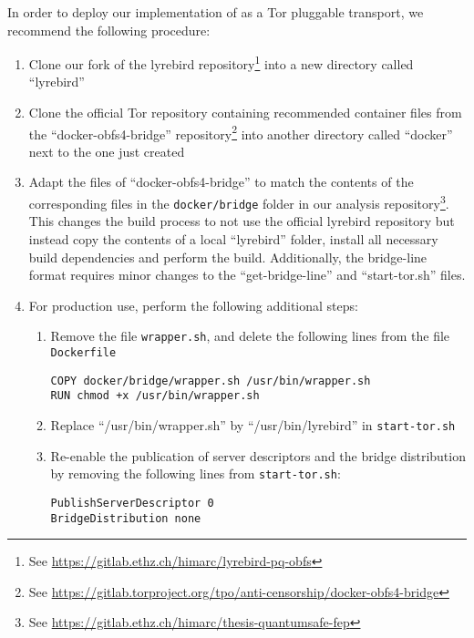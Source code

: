 In order to deploy our implementation of \drivel{} as a Tor pluggable transport, we recommend the following procedure:
\begin{enumerate}
    \item Clone our fork of the lyrebird repository\footnote{See \url{https://gitlab.ethz.ch/himarc/lyrebird-pq-obfs}} into a new directory called ``lyrebird''
    
    \item Clone the official Tor repository containing recommended container files from the ``docker-obfs4-bridge'' repository\footnote{See \url{https://gitlab.torproject.org/tpo/anti-censorship/docker-obfs4-bridge}} into another directory called ``docker'' next to the one just created
    
    \item Adapt the files of ``docker-obfs4-bridge'' to match the contents of the corresponding files in the \texttt{docker/bridge} folder in our analysis repository\footnote{See \url{https://gitlab.ethz.ch/himarc/thesis-quantumsafe-fep}}. This changes the build process to not use the official lyrebird repository but instead copy the contents of a local ``lyrebird'' folder, install all necessary build dependencies and perform the build. Additionally, the bridge-line format requires minor changes to the ``get-bridge-line'' and ``start-tor.sh'' files.

    \item For production use, perform the following additional steps:
    \begin{enumerate}
        \item Remove the file \texttt{wrapper.sh}, and delete the following lines from the file \texttt{Dockerfile}
        \begin{lstlisting}
COPY docker/bridge/wrapper.sh /usr/bin/wrapper.sh
RUN chmod +x /usr/bin/wrapper.sh
        \end{lstlisting}

        \item Replace ``/usr/bin/wrapper.sh'' by ``/usr/bin/lyrebird'' in \texttt{start-tor.sh}

        \item Re-enable the publication of server descriptors and the bridge distribution by removing the following lines from \texttt{start-tor.sh}:
        \begin{lstlisting}
PublishServerDescriptor 0
BridgeDistribution none
        \end{lstlisting}
    \end{enumerate}
    \label{bul:prod-use-changes}


\end{enumerate}
